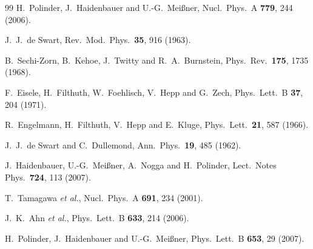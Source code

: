 \documentclass[aps,rmp,nofootinbib,twocolumn,floatfix]{revtex4}
\begin{document}
\begin{thebibliography}{99}
  H.~Polinder, J.~Haidenbauer and U.-G.~Mei{\ss}ner,
  Nucl.\ Phys.\  A {\bf 779}, 244 (2006).

  J.~J.~de Swart,
  Rev.\ Mod.\ Phys.\  {\bf 35}, 916 (1963).

  B.~Sechi-Zorn, B.~Kehoe, J.~Twitty and R.~A.~Burnstein,
  Phys.\ Rev.\  {\bf 175}, 1735 (1968).

  F.~Eisele, H.~Filthuth, W.~Foehlisch, V.~Hepp and G.~Zech,
  Phys.\ Lett.\  B {\bf 37}, 204 (1971).

  R.~Engelmann, H.~Filthuth, V.~Hepp and E.~Kluge,
  Phys.\ Lett.\  {\bf 21}, 587 (1966).

  J.~J.~de Swart and C.~Dullemond,
  Ann.\ Phys.\  {\bf 19}, 485 (1962).


  J.~Haidenbauer, U.-G.~Mei{\ss}ner, A.~Nogga and H.~Polinder,
  Lect.\ Notes Phys.\  {\bf 724}, 113 (2007).

  T.~Tamagawa {\it et al.},
  Nucl.\ Phys.\  A {\bf 691}, 234 (2001).

  J.~K.~Ahn {\it et al.},
  Phys.\ Lett.\  B {\bf 633}, 214 (2006).

  H.~Polinder, J.~Haidenbauer and U.-G.~Mei\ss ner,
  Phys.\ Lett.\  B {\bf 653}, 29 (2007).



\end{thebibliography}
\end{document}
